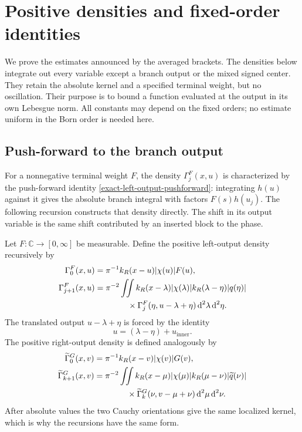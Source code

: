 \documentclass[a4paper,11pt]{article}
\newcommand{\C}{\mathbb{C}}
\newcommand{\dd}{\,\text{d}}
\theoremstyle{plain}
\theoremstyle{definition}
\theoremstyle{remark}
\begin{document}
\section{Positive densities and fixed-order identities}\label{sec:positive-densities}

We prove the estimates announced by the averaged brackets. The densities below integrate out every variable except a branch output or the mixed signed center. They retain the absolute kernel and a specified terminal weight, but no oscillation. Their purpose is to bound a function evaluated at the output in its own Lebesgue norm. All constants may depend on the fixed orders; no estimate uniform in the Born order is needed here.

\subsection{Push-forward to the branch output}
\label{subsubsec-positive-output-densities}

For a nonnegative terminal weight $F$, the density $\Gamma_j^F(x,u)$ is characterized by the push-forward identity \eqref{exact-left-output-pushforward}: integrating $h(u)$ against it gives the absolute branch integral with factors $F(s)h(u_j)$. The following recursion constructs that density directly. The shift in its output variable is the same shift contributed by an inserted block to the phase.

Let $F:\C\to[0,\infty]$ be measurable.  Define the positive left-output
density recursively by
\begin{align}
\Gamma_0^F(x,u)
&=\pi^{-1}k_R(x-u)|\chi(u)|F(u),
\label{positive-left-output-0}\\
\Gamma_{j+1}^F(x,u)
&=\pi^{-2}\iint
 k_R(x-\lambda)|\chi(\lambda)|
 k_R(\lambda-\eta)|q(\eta)| \notag\\
&\qquad\qquad\times
 \Gamma_j^F(\eta,u-\lambda+\eta)
 \dd^2\lambda\dd^2\eta .
\label{positive-left-output-rec}
\end{align}
The translated output $u-\lambda+\eta$ is forced by the identity
\[
 u=(\lambda-\eta)+u_{\mathrm{inner}}.
\]
The positive right-output density is defined analogously by
\begin{align}
\widetilde\Gamma_0^G(x,v)
&=\pi^{-1}k_R(x-v)|\chi(v)|G(v),
\label{positive-right-output-0}\\
\widetilde\Gamma_{k+1}^G(x,v)
&=\pi^{-2}\iint
 k_R(x-\mu)|\chi(\mu)|
 k_R(\mu-\nu)|\widetilde q(\nu)| \notag\\
&\qquad\qquad\times
 \widetilde\Gamma_k^G(\nu,v-\mu+\nu)
 \dd^2\mu\dd^2\nu .
\label{positive-right-output-rec}
\end{align}
After absolute values the two Cauchy orientations give the same localized
kernel, which is why the recursions have the same form.
\end{document}
